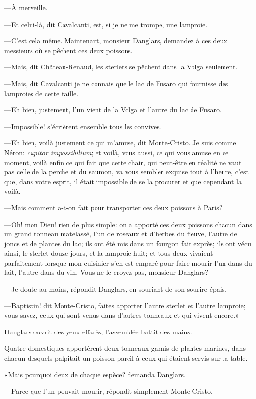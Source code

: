 —À merveille. 

—Et celui-là, dit Cavalcanti, est, si je ne me trompe, une lamproie. 

—C'est cela même. Maintenant, monsieur Danglars, demandez à ces deux messieurs où se pêchent ces deux poissons. 

—Mais, dit Château-Renaud, les sterlets se pêchent dans la Volga seulement. 

—Mais, dit Cavalcanti je ne connais que le lac de Fusaro qui fournisse des lamproies de cette taille. 

—Eh bien, justement, l'un vient de la Volga et l'autre du lac de Fusaro. 

—Impossible! s'écrièrent ensemble tous les convives. 

—Eh bien, voilà justement ce qui m'amuse, dit Monte-Cristo. Je suis comme Néron: \textit{cupitor impossibilium}; et voilà, vous aussi, ce qui vous amuse en ce moment, voilà enfin ce qui fait que cette chair, qui peut-être en réalité ne vaut pas celle de la perche et du saumon, va vous sembler exquise tout à l'heure, c'est que, dans votre esprit, il était impossible de se la procurer et que cependant la voilà.  

—Mais comment a-t-on fait pour transporter ces deux poissons à Paris? 

—Oh! mon Dieu! rien de plus simple: on a apporté ces deux poissons chacun dans un grand tonneau matelassé, l'un de roseaux et d'herbes du fleuve, l'autre de joncs et de plantes du lac; ils ont été mis dans un fourgon fait exprès; ils ont vécu ainsi, le sterlet douze jours, et la lamproie huit; et tous deux vivaient parfaitement lorsque mon cuisinier s'en est emparé pour faire mourir l'un dans du lait, l'autre dans du vin. Vous ne le croyez pas, monsieur Danglars? 

—Je doute au moins, répondit Danglars, en souriant de son sourire épais. 

—Baptistin! dit Monte-Cristo, faites apporter l'autre sterlet et l'autre lamproie; vous savez, ceux qui sont venus dans d'autres tonneaux et qui vivent encore.» 

Danglars ouvrit des yeux effarés; l'assemblée battit des mains. 

Quatre domestiques apportèrent deux tonneaux garnis de plantes marines, dans chacun desquels palpitait un poisson pareil à ceux qui étaient servis sur la table. 

«Mais pourquoi deux de chaque espèce? demanda Danglars. 

—Parce que l'un pouvait mourir, répondit simplement Monte-Cristo. 

